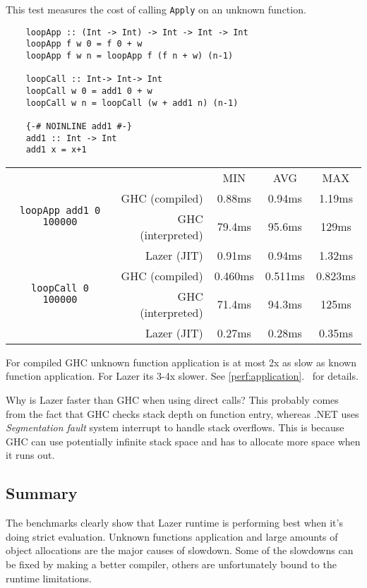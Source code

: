 \documentclass[en]{pracamgr}
\newcommand{\myref}[1]{\ref{#1}.~\textit{\nameref{#1}}}
\begin{document}
This test measures the cost of calling \texttt{Apply}
on an unknown function.

\begin{verbatim}
    loopApp :: (Int -> Int) -> Int -> Int -> Int
    loopApp f w 0 = f 0 + w
    loopApp f w n = loopApp f (f n + w) (n-1)
    
    loopCall :: Int-> Int-> Int
    loopCall w 0 = add1 0 + w
    loopCall w n = loopCall (w + add1 n) (n-1)
    
    {-# NOINLINE add1 #-}
    add1 :: Int -> Int
    add1 x = x+1
\end{verbatim}

\begin{center}
\begin{tabular}{c r c c c}
    & & MIN & AVG & MAX \\
    \cline{3-5}

    \multirow{2}{*}{\texttt{loopApp add1 0 100000}}
    & GHC (compiled)& 0.88ms & 0.94ms & 1.19ms \\
    & GHC (interpreted)& 79.4ms & 95.6ms & 129ms \\
    & Lazer (JIT)& 0.91ms & 0.94ms & 1.32ms \\
    \cline{2-5}

    \multirow{2}{*}{\texttt{loopCall 0 100000}}
    & GHC (compiled)& 0.460ms & 0.511ms & 0.823ms \\
    & GHC (interpreted)& 71.4ms & 94.3ms & 125ms \\
    & Lazer (JIT)& 0.27ms & 0.28ms & 0.35ms \\
\end{tabular}
\end{center}

For compiled GHC unknown function application is at most
2x as slow as known function application.
For Lazer its 3-4x slower. See \myref{perf:application} for details.

Why is Lazer faster than GHC when using direct calls?
This probably comes from
the fact that GHC checks stack depth on function entry,
whereas .NET uses \textit{Segmentation fault} system interrupt
to handle stack overflows.
This is because GHC can use potentially infinite stack space
and has to allocate more space when it runs out.

\subsection{Summary}

The benchmarks clearly show that Lazer runtime is performing
best when it's doing strict evaluation.
Unknown functions application and large amounts of object allocations
are the major causes of slowdown.
Some of the slowdowns can be fixed by making a better compiler,
others are unfortunately bound to the runtime limitations.
\end{document}
